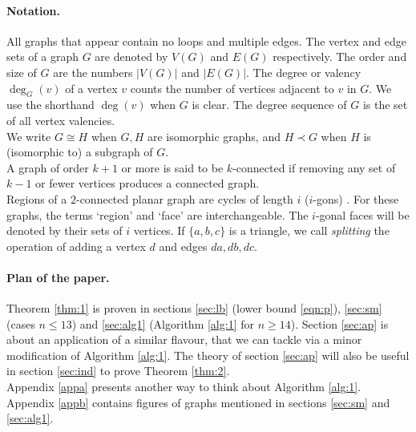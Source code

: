\documentclass[11pt]{article}
\theoremstyle{definition}
\numberwithin{equation}{section}
\begin{document}
\paragraph{Notation.}
All graphs that appear contain no loops and multiple edges. The vertex and edge sets of a graph $G$ are denoted by $V(G)$ and $E(G)$ respectively. The order and size of $G$ are the numbers $|V(G)|$ and $|E(G)|$. The degree or valency $\deg_G(v)$ of a vertex $v$ counts the number of vertices adjacent to $v$ in $G$. We use the shorthand $\deg(v)$ when $G$ is clear. The degree sequence of $G$ is the set of all vertex valencies.
\\
We write $G\cong H$ when $G,H$ are isomorphic graphs, and $H\prec G$ when $H$ is (isomorphic to) a subgraph of $G$.
\\
A graph of order $k+1$ or more is said to be $k$-connected if removing any set of $k-1$ or fewer vertices produces a connected graph.
\\
Regions of a $2$-connected planar graph are cycles of length $i$ ($i$-gons) \cite[Proposition 4.26]{dieste}. For these graphs, the terms `region' and `face' are interchangeable. The $i$-gonal faces will be denoted by their sets of $i$ vertices. If $\{a,b,c\}$ is a triangle, we call \textit{splitting} the operation of adding a vertex $d$ and edges $da, db, dc$.


\paragraph{Plan of the paper.}
Theorem \ref{thm:1} is proven in sections \ref{sec:lb} (lower bound \eqref{eqn:p}), \ref{sec:sm} (cases $n\leq 13$) and \ref{sec:alg1} (Algorithm \ref{alg:1} for $n\geq 14$). Section \ref{sec:ap} is about an application of a similar flavour, that we can tackle via a minor modification of Algorithm \ref{alg:1}. The theory of section \ref{sec:ap} will also be useful in section \ref{sec:ind} to prove Theorem \ref{thm:2}.
\\
Appendix \ref{appa} presents another way to think about Algorithm \ref{alg:1}. Appendix \ref{appb} contains figures of graphs mentioned in sections \ref{sec:sm} and \ref{sec:alg1}.
\end{document}
